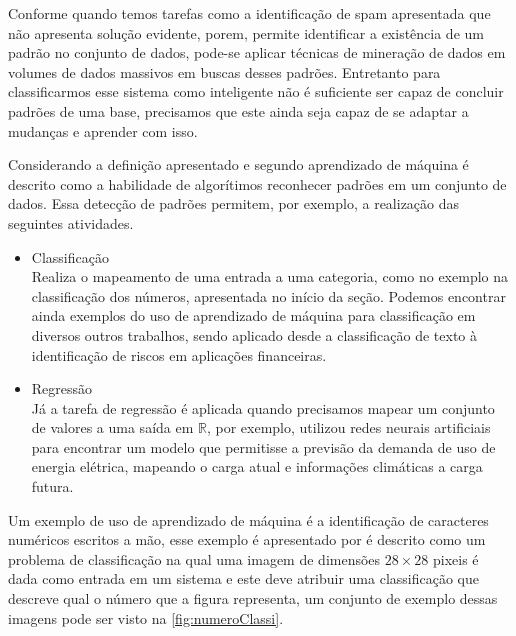 \documentclass[
    12pt,
    oneside,
    a4paper,
    english,
    brazil
]{abntex2}
\begin{document}
Conforme  quando  temos tarefas como a  identificação de spam
apresentada que  não apresenta solução  evidente, porem, permite  identificar a
existência  de um  padrão no  conjunto de  dados, pode-se  aplicar técnicas  de
mineração  de dados  em volumes  de dados  massivos em  buscas desses  padrões.
Entretanto para classificarmos  esse sistema como inteligente  não é suficiente
ser capaz de concluir padrões de uma base, precisamos que este ainda seja capaz
de se adaptar a mudanças e aprender com isso.

Considerando  a definição  apresentado  e segundo  
aprendizado de máquina  é descrito como a habilidade  de algorítimos reconhecer
padrões  em um  conjunto  de  dados. Essa  detecção  de  padrões permitem,  por
exemplo, a realização das seguintes atividades.
\begin{itemize}
    \item Classificação\\
        Realiza  o  mapeamento  de  uma   entrada  a  uma  categoria,  como  no
        exemplo  na  classificação  dos   números,  apresentada  no  início  da
        seção.  Podemos   encontrar  ainda  exemplos  do   uso  de  aprendizado
        de  máquina  para  classificação  em diversos  outros  trabalhos, sendo
        aplicado desde a classificação de texto à identificação de riscos em
        aplicações financeiras.
    \item Regressão\\
        Já  a  tarefa de  regressão  é  aplicada  quando precisamos  mapear  um
        conjunto  de valores  a  uma  saída em  $  \mathbb{R}  $, por  exemplo,
           utilizou   redes  neurais   artificiais   para
        encontrar um  modelo que  permitisse a  previsão da  demanda de  uso de
        energia elétrica,  mapeando o  carga atual  e informações  climáticas a
        carga futura.
\end{itemize}

Um  exemplo   de  uso  de   aprendizado  de   máquina  é  a   identificação  de
caracteres  numéricos   escritos  a  mão,   esse  exemplo  é   apresentado  por
 é  descrito como  um problema de  classificação na
qual uma imagem  de dimensões $28 \times  28$ pixeis é dada como  entrada em um
sistema e este deve atribuir uma classificação que descreve qual o número que a
figura representa,  um conjunto  de exemplo  dessas imagens  pode ser  visto na
\autoref{fig:numeroClassi}.
\end{document}
